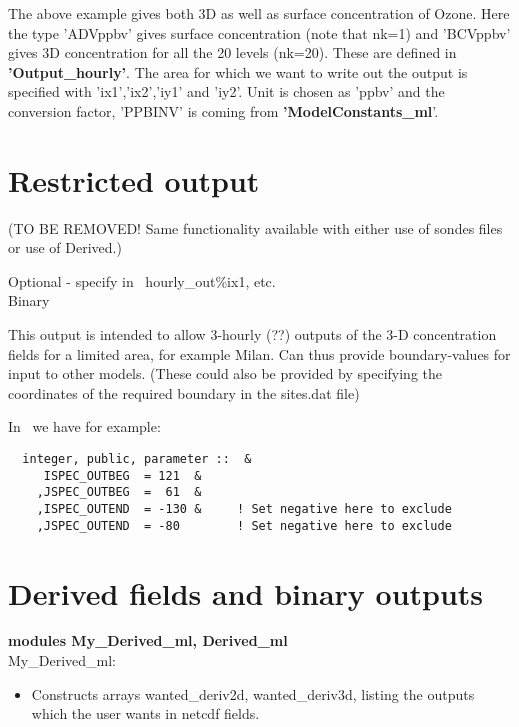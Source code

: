 The above example gives both 3D as well as surface concentration of
Ozone.  Here the type 'ADVppbv' gives surface concentration (note
that nk=1) and 'BCVppbv' gives 3D concentration for all the 20 levels
(nk=20). These are defined in {\bf 'Output\_hourly'}.  The area for which we want to write out the output is
specified with 'ix1','ix2','iy1' and 'iy2'.  Unit is chosen as 'ppbv'
and the conversion factor, 'PPBINV' is coming from
{\bf 'ModelConstants\_ml}'.  


\section{Restricted output}
(TO BE REMOVED! Same functionality available with either use of
sondes files or use of Derived.)

\noindent
Optional -  specify in \MyOutputs\, hourly\_out\%ix1, etc.\\
Binary
\vspace{1cm}

This output is intended to allow 3-hourly (??) outputs of the 3-D concentration
fields for a limited area, for example Milan. Can thus provide boundary-values
for input to other models. (These could also be provided by specifying the
coordinates of the required boundary in the sites.dat file)

In \MyOutputs\ we have for example:

\begin{small}
\begin{verbatim}
  integer, public, parameter ::  &
	 ISPEC_OUTBEG  = 121  &
	,JSPEC_OUTBEG  =  61  &
	,ISPEC_OUTEND  = -130 &     ! Set negative here to exclude
	,JSPEC_OUTEND  = -80        ! Set negative here to exclude
\end{verbatim}
\end{small}


\section{Derived fields and binary outputs}

{\bf modules My\_Derived\_ml, Derived\_ml}\\

My\_Derived\_ml:\\
\begin{itemize}
  \item Constructs arrays wanted\_deriv2d, wanted\_deriv3d, listing
   the outputs which the user wants in netcdf fields.
\end{itemize}


